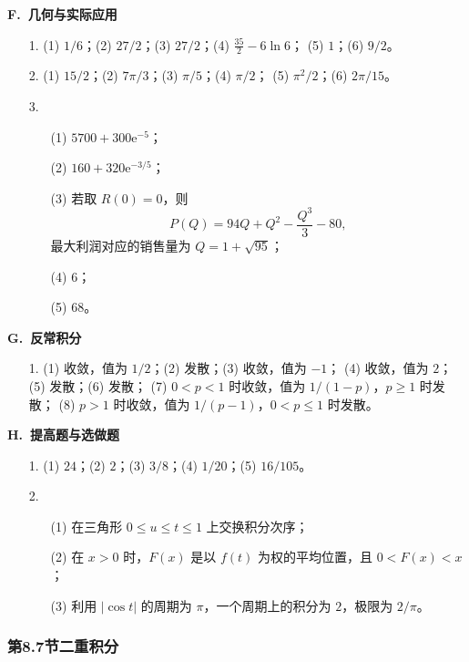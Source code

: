 \documentclass[fontset=fandol]{ctexart}
\newcommand{\ee}{\mathrm{e}}
\begin{document}
\textbf{F.\ 几何与实际应用}

\begin{enumerate}
\item[1.] (1) $1/6$；(2) $27/2$；(3) $27/2$；(4) $\displaystyle \frac{35}{2}-6\ln6$；
(5) $1$；(6) $9/2$。
\item[2.] (1) $15/2$；(2) $7\pi/3$；(3) $\pi/5$；(4) $\pi/2$；
(5) $\pi^2/2$；(6) $2\pi/15$。
\item[3.]
\begin{enumerate}
\item[(1)] $\displaystyle 5700+300\ee^{-5}$；
\item[(2)] $\displaystyle 160+320\ee^{-3/5}$；
\item[(3)] 若取 $R(0)=0$，则
\[
P(Q)=94Q+Q^2-\frac{Q^3}{3}-80,
\]
最大利润对应的销售量为 $Q=1+\sqrt{95}$；
\item[(4)] $6$；
\item[(5)] $68$。
\end{enumerate}
\end{enumerate}

\textbf{G.\ 反常积分}

\begin{enumerate}
\item[1.] (1) 收敛，值为 $1/2$；(2) 发散；(3) 收敛，值为 $-1$；
(4) 收敛，值为 $2$；(5) 发散；(6) 发散；
(7) $0<p<1$ 时收敛，值为 $\displaystyle 1/(1-p)$，$p\geq1$ 时发散；
(8) $p>1$ 时收敛，值为 $\displaystyle 1/(p-1)$，$0<p\leq1$ 时发散。
\end{enumerate}

\textbf{H.\ 提高题与选做题}

\begin{enumerate}
\item[1.] (1) $24$；(2) $2$；(3) $3/8$；(4) $1/20$；(5) $16/105$。
\item[2.]
\begin{enumerate}
\item[(1)] 在三角形 $0\leq u\leq t\leq1$ 上交换积分次序；
\item[(2)] 在 $x>0$ 时，$F(x)$ 是以 $f(t)$ 为权的平均位置，且 $0<F(x)<x$；
\item[(3)] 利用 $|\cos t|$ 的周期为 $\pi$，一个周期上的积分为 $2$，极限为 $2/\pi$。
\end{enumerate}
\end{enumerate}

\subsubsection*{第8.7节\quad 二重积分}
\end{document}
